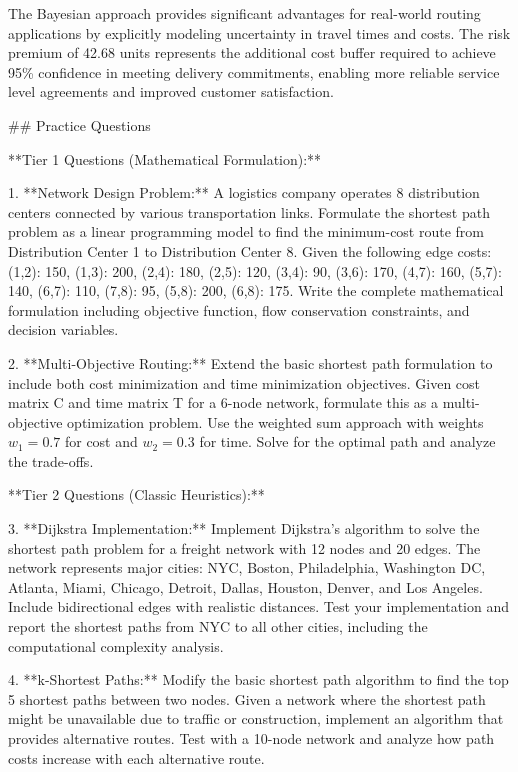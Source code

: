 \documentclass{article}
\begin{document}
The Bayesian approach provides significant advantages for real-world routing applications by explicitly modeling uncertainty in travel times and costs. The risk premium of 42.68 units represents the additional cost buffer required to achieve 95\% confidence in meeting delivery commitments, enabling more reliable service level agreements and improved customer satisfaction.

## Practice Questions

**Tier 1 Questions (Mathematical Formulation):**

1. **Network Design Problem:** A logistics company operates 8 distribution centers connected by various transportation links. Formulate the shortest path problem as a linear programming model to find the minimum-cost route from Distribution Center 1 to Distribution Center 8. Given the following edge costs: (1,2): 150, (1,3): 200, (2,4): 180, (2,5): 120, (3,4): 90, (3,6): 170, (4,7): 160, (5,7): 140, (6,7): 110, (7,8): 95, (5,8): 200, (6,8): 175. Write the complete mathematical formulation including objective function, flow conservation constraints, and decision variables.

2. **Multi-Objective Routing:** Extend the basic shortest path formulation to include both cost minimization and time minimization objectives. Given cost matrix C and time matrix T for a 6-node network, formulate this as a multi-objective optimization problem. Use the weighted sum approach with weights $w_1 = 0.7$ for cost and $w_2 = 0.3$ for time. Solve for the optimal path and analyze the trade-offs.

**Tier 2 Questions (Classic Heuristics):**

3. **Dijkstra Implementation:** Implement Dijkstra's algorithm to solve the shortest path problem for a freight network with 12 nodes and 20 edges. The network represents major cities: NYC, Boston, Philadelphia, Washington DC, Atlanta, Miami, Chicago, Detroit, Dallas, Houston, Denver, and Los Angeles. Include bidirectional edges with realistic distances. Test your implementation and report the shortest paths from NYC to all other cities, including the computational complexity analysis.

4. **k-Shortest Paths:** Modify the basic shortest path algorithm to find the top 5 shortest paths between two nodes. Given a network where the shortest path might be unavailable due to traffic or construction, implement an algorithm that provides alternative routes. Test with a 10-node network and analyze how path costs increase with each alternative route.
\end{document}
